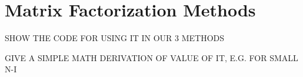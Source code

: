 \chapter{Matrix Factorization Methods}  
\label{chap:svd} 

SHOW THE CODE FOR USING IT IN OUR 3 METHODS

GIVE A SIMPLE MATH DERIVATION OF VALUE OF IT, E.G. FOR SMALL N-I

